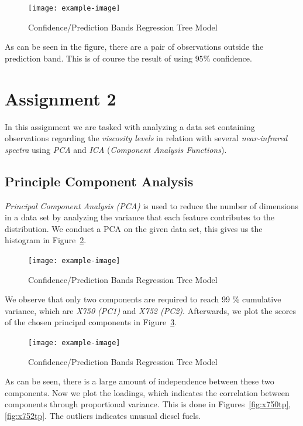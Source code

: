 \documentclass[a4paper, twocolumn]{article}
\begin{document}
        \begin{figure}[h!]
          \centering
          \caption{Confidence/Prediction Bands Regression Tree Model}
          \label{fig:confpred_bands}
          \texttt{[image: example-image]}
        \end{figure}

    As can be seen in the figure, there are a pair of observations outside the prediction band. This is of course the result of using $95\%$ confidence.

    \section*{Assignment 2}

    In this assignment we are tasked with analyzing a data set containing observations regarding the \emph{viscosity levels} in relation with several \emph{near-infrared spectra} using \emph{PCA} and \emph{ICA} (\emph{Component Analysis Functions}).

    \subsection*{Principle Component Analysis}

    \emph{Principal Component Analysis (PCA)} is used to reduce the number of dimensions in a data set by analyzing the variance that each feature contributes to the distribution. We conduct a PCA on the given data set, this gives us the histogram in Figure~\ref{fig:pcahist}.

        \begin{figure}[h!]
          \centering
          \caption{Confidence/Prediction Bands Regression Tree Model}
          \label{fig:pcahist}
          \texttt{[image: example-image]}
        \end{figure}

    We observe that only two components are required to reach 99 \% cumulative variance, which are \emph{X750 (PC1)} and \emph{X752 (PC2)}. Afterwards, we plot the scores of the chosen principal components in Figure~\ref{fig:pcascore.eps}.

        \begin{figure}[h!]
          \centering
          \caption{Confidence/Prediction Bands Regression Tree Model}
          \label{fig:pcascore.eps}
          \texttt{[image: example-image]}
        \end{figure}

        As can be seen, there is a large amount of independence between these two components. Now we plot the loadings, which indicates the correlation between components through proportional variance. This is done in Figures~\ref{fig:x750tp}, \ref{fig:x752tp}. The outliers indicates unusual diesel fuels.
\end{document}
